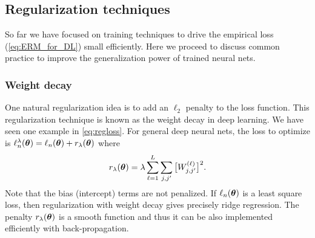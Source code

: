 





\subsection{Regularization techniques} \label{sec:regularization}
So far we have focused on training techniques to drive the empirical loss (\ref{eq:ERM_for_DL}) small efficiently. Here we proceed to discuss common practice to improve the generalization power of trained neural nets.


\subsubsection{Weight decay} \label{sec:weight}
One natural regularization idea is to add an $\ell_{2}$
penalty to the loss function. This regularization technique is known
as the weight decay in deep learning. We have seen one example in
\eqref{eq:regloss}. For general deep neural nets, the loss to optimize
is $\ell_n^{\lambda}(\text{\boldmath $\theta$})=\ell_{n}(\text{\boldmath $\theta$})+r_{\lambda}(\text{\boldmath $\theta$})$ where %
\[
r_{\lambda}(\text{\boldmath $\theta$})=\lambda\sum_{\ell=1}^{L}\sum_{j,j'}\big[W_{j,j'}^{(\ell)}\big]^{2}.
\]
Note that the bias (intercept) terms are not penalized. If $\ell_{n}(\text{\boldmath $\theta$})$
is a least square loss, then regularization with weight decay gives
precisely ridge regression. The penalty $r_{\lambda}(\text{\boldmath $\theta$})$ is a smooth
function and thus it can be also implemented efficiently with back-propagation.

